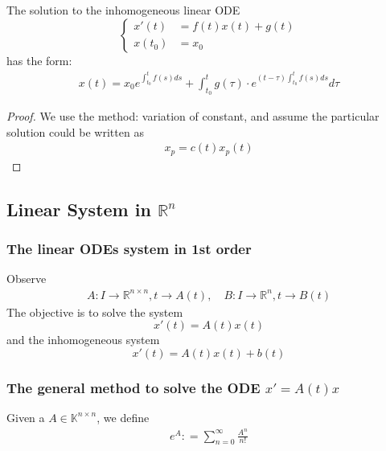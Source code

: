 \begin{theorem}
	The solution to the inhomogeneous linear ODE
		\begin{equation*}
	\left\{
	\begin{aligned}
		x'(t) &= f(t)x(t) + g(t)\\
		x(t_0) &= x_0
	\end{aligned}
	\right.
	\end{equation*}
	has the form:
	\begin{align*}
		x(t) = x_0 e^{\int_{t_0}^{t} f(s) ds } + \int_{t_0}^t g(\tau) \cdot e^{(t - \tau) \int_{t_0}^t f(s)ds} d\tau
	\end{align*}
\end{theorem}
\begin{proof}
	We use the method: variation of constant, and assume the particular solution could be written as 
	\begin{align*}
		x_p = c(t) x_p(t)
	\end{align*}
\end{proof}

\subsection{Linear System in $\mathbb{R}^n$}


\subsubsection*{The linear ODEs system in 1st order}
Observe
\begin{align*}
	A: I \rightarrow \mathbb{R}^{n \times n}, t \rightarrow A(t) ,\quad B: I \rightarrow \mathbb{R}^n, t \rightarrow B(t)
\end{align*}
The objective is to solve the system
\begin{equation}
x'(t) = A(t) x(t)	
\end{equation}
and the inhomogeneous system
\begin{equation}
	x'(t) = A(t) x(t) + b(t)
\end{equation}

\subsubsection{The general method to solve the ODE $x' = A(t) x$ }
\begin{definition}
	Given a $A \in \mathbb{K}^{n \times n}$, we define
	\begin{align*}
		e^A : = \sum^{\infty}_{n = 0} \frac{A^n}{n!} 
	\end{align*}
\end{definition}

